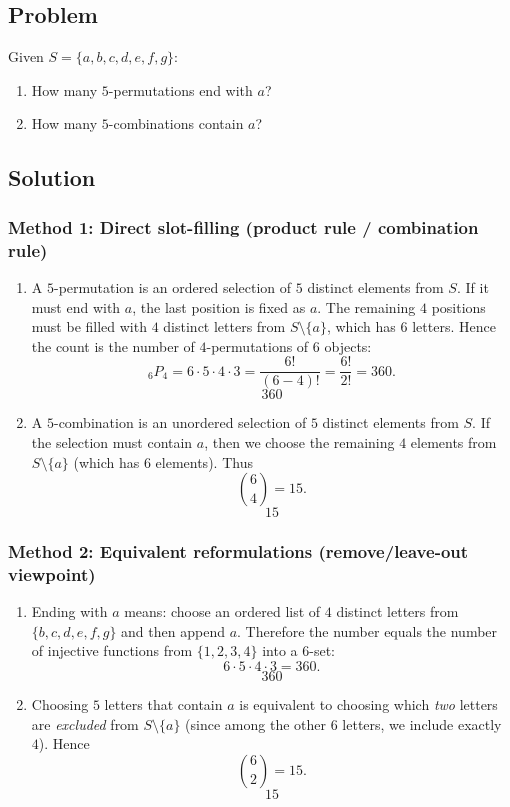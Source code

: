 \documentclass[12pt]{article}
\begin{document}
\subsection{Problem}
Given $S=\{a,b,c,d,e,f,g\}$:
\begin{enumerate}[label=(\alph*)]
\item How many $5$-permutations end with $a$?
\item How many $5$-combinations contain $a$?
\end{enumerate}

\subsection{Solution}

\subsubsection{Method 1: Direct slot-filling (product rule / combination rule)}
\begin{enumerate}[label=(\alph*)]
\item A $5$-permutation is an ordered selection of $5$ distinct elements from $S$. If it must end with $a$, the last position is fixed as $a$. The remaining $4$ positions must be filled with $4$ distinct letters from $S\setminus\{a\}$, which has $6$ letters. Hence the count is the number of $4$-permutations of $6$ objects:
\[
{}_{6}P_{4}=6\cdot 5\cdot 4\cdot 3=\frac{6!}{(6-4)!}=\frac{6!}{2!}=360.
\]
\[
\boxed{360}
\]

\item A $5$-combination is an unordered selection of $5$ distinct elements from $S$. If the selection must contain $a$, then we choose the remaining $4$ elements from $S\setminus\{a\}$ (which has $6$ elements). Thus
\[
\binom{6}{4}=15.
\]
\[
\boxed{15}
\]
\end{enumerate}

\subsubsection{Method 2: Equivalent reformulations (remove/leave-out viewpoint)}
\begin{enumerate}[label=(\alph*)]
\item Ending with $a$ means: choose an ordered list of $4$ distinct letters from $\{b,c,d,e,f,g\}$ and then append $a$. Therefore the number equals the number of injective functions from $\{1,2,3,4\}$ into a $6$-set:
\[
6\cdot 5\cdot 4\cdot 3=360.
\]
\[
\boxed{360}
\]

\item Choosing $5$ letters that contain $a$ is equivalent to choosing which \emph{two} letters are \emph{excluded} from $S\setminus\{a\}$ (since among the other $6$ letters, we include exactly $4$). Hence
\[
\binom{6}{2}=15.
\]
\[
\boxed{15}
\]
\end{enumerate}
\end{document}
